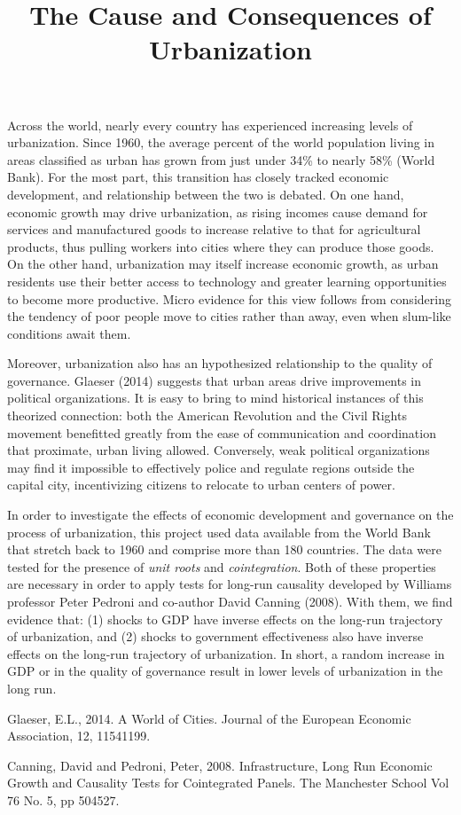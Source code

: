 \documentclass[12pt]{article}
\title{The Cause and Consequences of Urbanization}
\begin{document}
Across the world, nearly every country has experienced increasing levels of urbanization. Since 1960, the average percent of the world population living in areas classified as urban has grown from just under 34\% to nearly 58\% (World Bank). For the most part, this transition has closely tracked economic development, and relationship between the two is debated. On one hand, economic growth may drive urbanization, as rising incomes cause demand for services and manufactured goods to increase relative to that for agricultural products, thus pulling workers into cities where they can produce those goods. On the other hand, urbanization may itself increase economic growth, as urban residents use their better access to technology and greater learning opportunities to become more productive. Micro evidence for this view follows from considering the tendency of poor people move to cities rather than away, even when slum-like conditions await them.

Moreover, urbanization also has an hypothesized relationship to the quality of governance. Glaeser (2014) suggests that urban areas drive improvements in political organizations. It is easy to bring to mind historical instances of this theorized connection: both the American Revolution and the Civil Rights movement benefitted greatly from the ease of communication and coordination that proximate, urban living allowed. Conversely, weak political organizations may find it impossible to effectively police and regulate regions outside the capital city, incentivizing citizens to relocate to urban centers of power.

In order to investigate the effects of economic development and governance on the process of urbanization, this project used data available from the World Bank that stretch back to 1960 and comprise more than 180 countries. The data were tested for the presence of \textit{unit roots} and \textit{cointegration}. Both of these properties are necessary in order to apply tests for long-run causality developed by Williams professor Peter Pedroni and co-author David Canning (2008). With them, we find evidence that: (1) shocks to GDP have inverse effects on the long-run trajectory of urbanization, and (2) shocks to government effectiveness also have inverse effects on the long-run trajectory of urbanization. In short, a random increase in GDP or in the quality of governance result in lower levels of urbanization in the long run.

\begin{thebibliography}{9}

Glaeser, E.L., 2014. A World of Cities. Journal of the European Economic Association, 12, 11541199.

Canning, David and Pedroni, Peter, 2008. Infrastructure, Long Run Economic Growth and Causality Tests
for Cointegrated Panels. The Manchester School Vol 76 No. 5, pp 504527.

\end{thebibliography}
\end{document}
